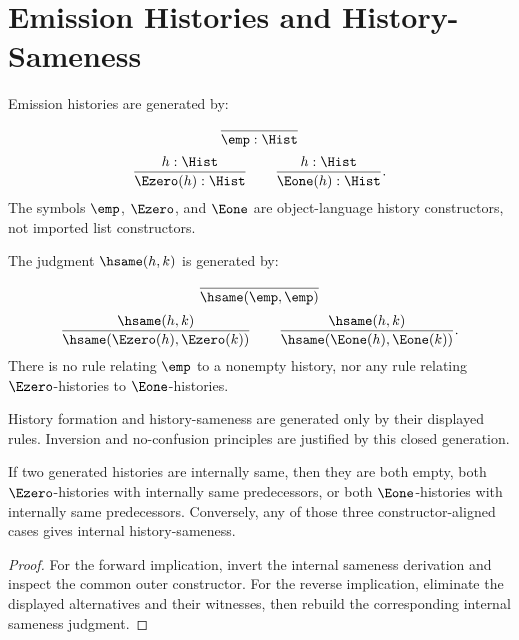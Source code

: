 \chapter{Emission Histories and History-Sameness}
\label{ch:core-emission-histories-and-history-sameness}

\begin{definition}
Emission histories are generated by:
$$
\frac{}{\emp:\Hist}
$$
$$
\frac{h:\Hist}{\Ezero(h):\Hist}
\qquad
\frac{h:\Hist}{\Eone(h):\Hist}.
$$
The symbols \(\emp\), \(\Ezero\), and \(\Eone\) are object-language history constructors, not imported list constructors.
\end{definition}

\begin{definition}
\label{def:history-sameness}
The judgment \(\hsame(h,k)\) is generated by:
$$
\frac{}{\hsame(\emp,\emp)}
$$
$$
\frac{\hsame(h,k)}{\hsame(\Ezero(h),\Ezero(k))}
\qquad
\frac{\hsame(h,k)}{\hsame(\Eone(h),\Eone(k))}.
$$
There is no rule relating \(\emp\) to a nonempty history, nor any rule relating \(\Ezero\)-histories to \(\Eone\)-histories.
\end{definition}

\begin{axiomlike}
History formation and history-sameness are generated only by their displayed rules. Inversion and no-confusion principles are justified by this closed generation.
\end{axiomlike}

\begin{theorem}
\label{thm:history-constructor-characterization}
If two generated histories are internally same, then they are both empty, both \(\Ezero\)-histories with internally same predecessors, or both \(\Eone\)-histories with internally same predecessors. Conversely, any of those three constructor-aligned cases gives internal history-sameness.
\end{theorem}
\begin{proof}
For the forward implication, invert the internal sameness derivation and inspect the common outer constructor. For the reverse implication, eliminate the displayed alternatives and their witnesses, then rebuild the corresponding internal sameness judgment.
\end{proof}

